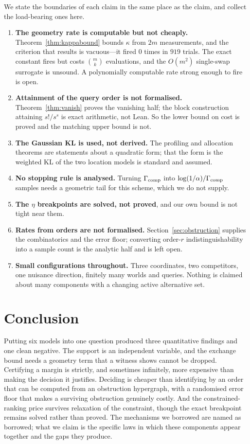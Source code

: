 We state the boundaries of each claim in the same place as the claim, and collect the
load-bearing ones here.

\begin{enumerate}
\item[1)] \textbf{The geometry rate is computable but not cheaply.}
Theorem~\ref{thm:kappabound} bounds $\kappa$ from $2m$ measurements, and the criterion that
results is vacuous---it fired $0$ times in $919$ trials. The exact constant fires but costs
$\binom{m}{k}$ evaluations, and the $O(m^{2})$ single-swap surrogate is unsound. A
polynomially computable rate strong enough to fire is open.
\item[2)] \textbf{Attainment of the query order is not formalised.} Theorem~\ref{thm:vanish}
proves the vanishing half; the block construction attaining $s!/s^{s}$ is exact arithmetic,
not Lean. So the lower bound on cost is proved and the matching upper bound is not.
\item[3)] \textbf{The Gaussian KL is used, not derived.} The profiling and allocation
theorems are statements about a quadratic form; that the form is the weighted KL of the two
location models is standard and assumed.
\item[4)] \textbf{No stopping rule is analysed.} Turning $\Gamma_{\rm comp}$ into
$\log(1/\alpha)/\Gamma_{\rm comp}$ samples needs a geometric tail for this scheme, which we
do not supply.
\item[5)] \textbf{The $\eta$ breakpoints are solved, not proved}, and our own bound is not
tight near them.
\item[6)] \textbf{Rates from orders are not formalised.} Section~\ref{sec:obstruction}
supplies the combinatorics and the error floor; converting order-$r$ indistinguishability
into a sample count is the analytic half and is left open.
\item[7)] \textbf{Small configurations throughout.} Three coordinates, two competitors, one
nuisance direction, finitely many worlds and queries. Nothing is claimed about many
components with a changing active alternative set.
\end{enumerate}

\section{Conclusion}

Putting six models into one question produced three quantitative findings and one clean
negative. The support is an independent variable, and the exchange bound needs a geometry
term that a witness shows cannot be dropped. Certifying a margin is strictly, and
sometimes infinitely, more expensive than making the decision it justifies. Deciding is
cheaper than identifying by an order that can be computed from an obstruction hypergraph,
with a randomised error floor that makes a surviving obstruction genuinely costly. And the
constrained-ranking price survives relaxation of the constraint, though the exact
breakpoint remains solved rather than proved. The mechanisms we borrowed are named as
borrowed; what we claim is the specific laws in which these components appear together and
the gaps they produce.

